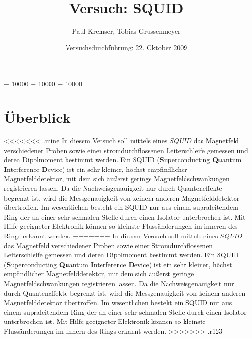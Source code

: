 \documentclass[12pt]{article}
\newcommand{\changefont}[3]{
\fontfamily{#1} \fontseries{#2} \fontshape{#3} \selectfont}
\begin{document}
\clubpenalty = 10000
\widowpenalty = 10000 
\displaywidowpenalty = 10000

\onehalfspacing
\changefont{ptm}{m}{n} 

\begin{titlepage}
\author{Paul Kremser, Tobias Grussenmeyer}
\title{Versuch: SQUID}
\date{Versuchsdurchführung: 22. Oktober 2009} 
\maketitle
\thispagestyle{empty}
\end{titlepage}


\tableofcontents
\thispagestyle{empty}
\newpage
{}
\section{Überblick}
<<<<<<< .mine
In diesem Versuch soll mittels eines \textit{SQUID} das Magnetfeld verschiedener Proben sowie einer stromdurchflossenen Leiterschleife gemessen und deren Dipolmoment bestimmt werden. Ein SQUID (\textbf{S}uper\-conducting \textbf{Qu}antum \textbf{I}nterference \textbf{D}evice) ist ein sehr kleiner, höchst empfindlicher Magnetfelddetektor, mit dem sich äußerst geringe Magnetfeldschwankungen registrieren lassen. Da die Nachweisgenauigkeit nur durch Quanteneffekte begrenzt ist, wird die Messgenauigkeit von keinem anderen Magnetfelddetektor übertroffen. Im wesentlichen besteht ein SQUID nur aus einem supraleitendem Ring der an einer sehr schmalen Stelle durch einen Isolator unterbrochen ist. Mit Hilfe geeigneter Elektronik können so kleinste Flussänderungen im inneren des Rings erkannt werden.
=======
In diesem Versuch soll mittels eines \textit{SQUID} das Magnetfeld verschiedener Proben sowie einer Stromdurchflossenen Leiterschleife gemessen und deren Dipolmoment bestimmt werden. Ein SQUID (\textbf{S}uper\-conducting \textbf{Qu}antum \textbf{I}nterference \textbf{D}evice) ist ein sehr kleiner, höchst empfindlicher Magnetfelddetektor, mit dem sich äußerst geringe Magnetfeldschwankungen registrieren lassen. Da die Nachweisgenauigkeit nur durch Quanteneffekte begrenzt ist, wird die Messgenauigkeit von keinem anderen Magnetfelddetektor übertroffen. Im wesentlichen besteht ein SQUID nur aus einem supraleitendem Ring der an einer sehr schmalen Stelle durch einen Isolator unterbrochen ist. Mit Hilfe geeigneter Elektronik können so kleinste Flussänderungen im Innern des Rings erkannt werden.
>>>>>>> .r123
\end{document}
